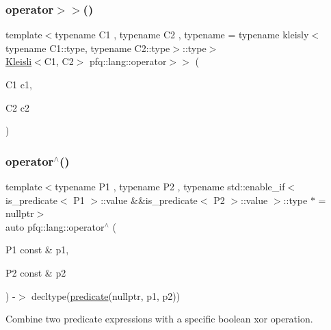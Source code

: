 \subsubsection{\texorpdfstring{operator$>$$>$()}{operator>>()}}
{\footnotesize\ttfamily template$<$typename C1 , typename C2 , typename  = typename kleisly$<$typename C1\+::type, typename C2\+::type$>$\+::type$>$ \\
\hyperlink{structpfq_1_1lang_1_1Kleisli}{Kleisli}$<$C1, C2$>$ pfq\+::lang\+::operator$>$$>$ (\begin{DoxyParamCaption}\item[{C1}]{c1,  }\item[{C2}]{c2 }\end{DoxyParamCaption})\hspace{0.3cm}{\ttfamily [inline]}}

\mbox{\label{namespacepfq_1_1lang_aa6692a978788617acebfee6ded6ebbbc}} 
\subsubsection{\texorpdfstring{operator$^\wedge$()}{operator^()}}
{\footnotesize\ttfamily template$<$typename P1 , typename P2 , typename std\+::enable\+\_\+if$<$ is\+\_\+predicate$<$ P1 $>$\+::value \&\&is\+\_\+predicate$<$ P2 $>$\+::value $>$\+::type $\ast$  = nullptr$>$ \\
auto pfq\+::lang\+::operator$^\wedge$ (\begin{DoxyParamCaption}\item[{P1 const \&}]{p1,  }\item[{P2 const \&}]{p2 }\end{DoxyParamCaption}) -\/$>$ decltype(\hyperlink{namespacepfq_1_1lang_aca9adafc436b7f851621b979fa1aaf88}{predicate}(nullptr, p1, p2))
    \hspace{0.3cm}{\ttfamily [inline]}}



Combine two predicate expressions with a specific boolean \textquotesingle{}xor\textquotesingle{} operation. 

\mbox{\label{namespacepfq_1_1lang_a425bb535884185450da7addcdb47f35b}} 
